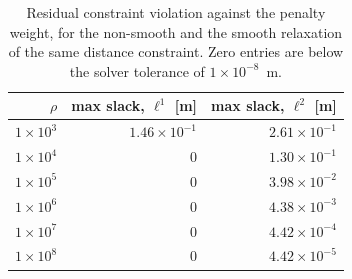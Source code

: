 \begin{table}[htbp]
  \centering
  \small
  \caption{Residual constraint violation against the penalty weight, for the non-smooth and the smooth relaxation of the same distance constraint. Zero entries are below the solver tolerance of $1\times 10^{-8}$~m.}
  \label{res:tab:penalty}
  \begin{tabular}{rrr}
    \toprule
    $\rho$ & max slack, $\ell^1$ [m] & max slack, $\ell^2$ [m] \\
    \midrule
    $1\times 10^{3}$ & $1.46\times 10^{-1}$ & $2.61\times 10^{-1}$ \\
    $1\times 10^{4}$ & $0$ & $1.30\times 10^{-1}$ \\
    $1\times 10^{5}$ & $0$ & $3.98\times 10^{-2}$ \\
    $1\times 10^{6}$ & $0$ & $4.38\times 10^{-3}$ \\
    $1\times 10^{7}$ & $0$ & $4.42\times 10^{-4}$ \\
    $1\times 10^{8}$ & $0$ & $4.42\times 10^{-5}$ \\
    \bottomrule
  \end{tabular}
\end{table}

